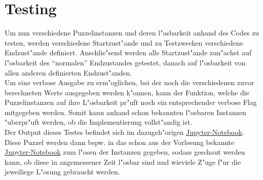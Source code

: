 \section{Testing} %
\label{cha:Testing}
Um nun verschiedene Puzzelinstanzen und deren l"osbarkeit anhand des Codes zu testen, werden verschiedene Startzust"ande und zu Testzwecken verschiedene Endzust"ande definiert. Anschlie"send werden alle Startzust"ande zun"achst auf l"osbarkeit des \enquote{normalen} Endzustandes getestet, danach auf l"osbarkeit von allen anderen definierten Endzust"anden.\\
Um eine verbose Ausgabe zu erm"oglichen, bei der noch die verschiedenen zuvor berechneten Werte ausgegeben werden k"onnen, kann der Funktion, welche die Puzzelinstanzen auf ihre L"osbarkeit pr"uft noch ein entsprechender verbose Flag mitgegeben werden. Somit kann anhand schon bekannten l"osbaren Instanzen "uberpr"uft werden, ob die Implementierung vollst"andig ist.\\
Der Output dieses Testes befindet sich im dazugeh"origen \textcolor{violet}{\href{https://github.com/stubifox/ai-termpaper/blob/main/code/15-solvable-v1.ipynb}{Jupyter-Notebook}}.\\
Diese Puzzel werden dann bspw. in das schon aus der Vorlesung bekannte \textcolor{violet}{\href{https://github.com/karlstroetmann/Artificial-Intelligence/blob/master/Python/1\%20Search/Iterative-Deepening-A-Star-Search.ipynb}{Jupyter-Notebook}} zum l"osen der Instanzen gegeben, sodass geschaut werden kann, ob diese in angemessener Zeit l"osbar sind und wieviele Z"uge f"ur die jeweiliege L"osung gebraucht werden.
